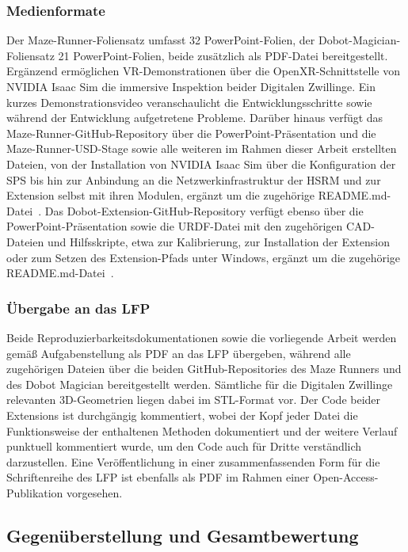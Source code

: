 \subsubsection{Medienformate}
Der Maze-Runner-Foliensatz umfasst 32 PowerPoint-Folien, der Dobot-Magician-Foliensatz 21 PowerPoint-Folien, beide zusätzlich als PDF-Datei bereitgestellt. Ergänzend ermöglichen VR-Demonstrationen über die OpenXR-Schnittstelle von NVIDIA Isaac Sim die immersive Inspektion beider Digitalen Zwillinge. Ein kurzes Demonstrationsvideo veranschaulicht die Entwicklungsschritte sowie während der Entwicklung aufgetretene Probleme.
Darüber hinaus verfügt das Maze-Runner-GitHub-Repository über die PowerPoint-Präsentation und die Maze-Runner-USD-Stage sowie alle weiteren im Rahmen dieser Arbeit erstellten Dateien, von der Installation von NVIDIA Isaac Sim über die Konfiguration der SPS bis hin zur Anbindung an die Netzwerkinfrastruktur der HSRM und zur Extension selbst mit ihren Modulen, ergänzt um die zugehörige README.md-Datei~\cite{kuester2026mazerunnerrepo}.
Das Dobot-Extension-GitHub-Repository verfügt ebenso über die PowerPoint-Präsentation sowie die URDF-Datei mit den zugehörigen CAD-Dateien und Hilfsskripte, etwa zur Kalibrierung, zur Installation der Extension oder zum Setzen des Extension-Pfads unter Windows, ergänzt um die zugehörige README.md-Datei~\cite{kuester2026dobotrepo}.

\subsubsection{Übergabe an das LFP}
Beide Reproduzierbarkeitsdokumentationen sowie die vorliegende Arbeit werden gemäß Aufgabenstellung als PDF an das LFP übergeben, während alle zugehörigen Dateien über die beiden GitHub-Repositories des Maze Runners und des Dobot Magician bereitgestellt werden. Sämtliche für die Digitalen Zwillinge relevanten 3D-Geometrien liegen dabei im STL-Format vor. Der Code beider Extensions ist durchgängig kommentiert, wobei der Kopf jeder Datei die Funktionsweise der enthaltenen Methoden dokumentiert und der weitere Verlauf punktuell kommentiert wurde, um den Code auch für Dritte verständlich darzustellen. Eine Veröffentlichung in einer zusammenfassenden Form für die Schriftenreihe des LFP ist ebenfalls als PDF im Rahmen einer Open-Access-Publikation vorgesehen.

\subsection{Gegenüberstellung und Gesamtbewertung}
\label{subsec:gesamtbewertung}

